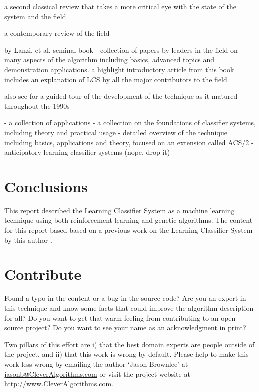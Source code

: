 \documentclass[a4paper, 11pt]{article}
\makeatletter
\newcommand{\myreportauthor}{Jason Brownlee}
\newcommand{\myreportemail}{jasonb@CleverAlgorithms.com}
\newcommand{\myreportwebsite}{http://www.CleverAlgorithms.com}
\makeatother
\begin{document}
a second classical review that takes a more critical eye with the state of the system and the field \cite{Wilson1989}

a contemporary review of the field \cite{Holmes2002}

by Lanzi, et al.
seminal book \cite{Lanzi2000} - collection of papers by leaders in the field on many aspects of the algorithm including basics, advanced topics and demonstration applications.
a highlight introductory article from this book includes an explanation of LCS by all the major contributors to the field \cite{Holland2000}

also see for a guided tour of the development of the technique as it matured throughout the 1990s \cite{Lanzi2000a}


\cite{Bull2004} - a collection of applications 
\cite{Bull2005} - a collection on the foundations of classifier systems, including theory and practical usage
\cite{Butz2002} - detailed overview of the technique including basics, applications and theory, focused on an extension called ACS/2 - anticipatory learning classifier systems (nope, drop it)


% 
% 
\section{Conclusions}
\label{sec:conclusions}
This report described the Learning Classifier System as a machine learning technique using both reinforcement learning and genetic algorithms. The content for this report based based on a previous work on the Learning Classifier System by this author \cite{Brownlee2007a}.

% 
% 
\section{Contribute}
\label{sec:contribute}
Found a typo in the content or a bug in the source code? 
Are you an expert in this technique and know some facts that could improve the algorithm description for all?
Do you want to get that warm feeling from contributing to an open source project? 
Do you want to see your name as an acknowledgment in print?

Two pillars of this effort are i) that the best domain experts are people outside of the project, and ii) that this work is wrong by default. 
Please help to make this work less wrong by emailing the author `\myreportauthor' at \url{\myreportemail} or visit the project website at \url{\myreportwebsite}.



\end{document}
